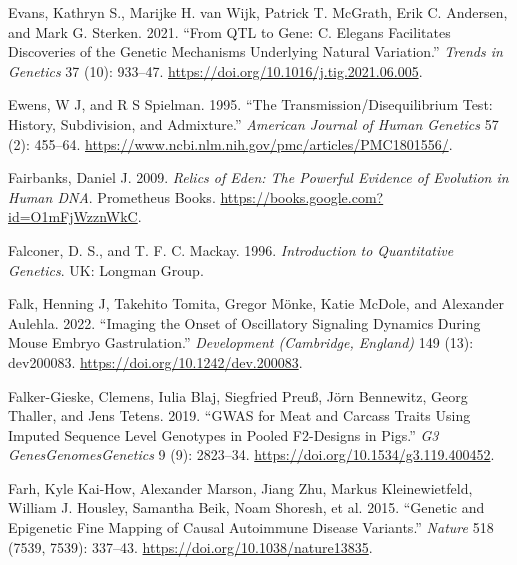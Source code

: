 \documentclass[
]{book}
\newlength{\cslhangindent}
\newlength{\cslentryspacingunit} %
\newenvironment{CSLReferences}[2] %
 {%
  \setlength{\parindent}{0pt}
  \ifodd #1
  \let\oldpar\par
  \def\par{\hangindent=\cslhangindent\oldpar}
  \fi
  \setlength{\parskip}{#2\cslentryspacingunit}
 }%
 {}
\begin{document}
\begin{CSLReferences}{1}{0}
\leavevmode{}%
Evans, Kathryn S., Marijke H. van Wijk, Patrick T. McGrath, Erik C. Andersen, and Mark G. Sterken. 2021. {``From {QTL} to Gene: {C}. Elegans Facilitates Discoveries of the Genetic Mechanisms Underlying Natural Variation.''} \emph{Trends in Genetics} 37 (10): 933--47. \url{https://doi.org/10.1016/j.tig.2021.06.005}.

\leavevmode{}%
Ewens, W J, and R S Spielman. 1995. {``The Transmission/Disequilibrium Test: History, Subdivision, and Admixture.''} \emph{American Journal of Human Genetics} 57 (2): 455--64. \url{https://www.ncbi.nlm.nih.gov/pmc/articles/PMC1801556/}.

\leavevmode{}%
Fairbanks, Daniel J. 2009. \emph{Relics of {Eden}: {The Powerful Evidence} of {Evolution} in {Human DNA}}. {Prometheus Books}. \url{https://books.google.com?id=O1mFjWzznWkC}.

\leavevmode{}%
Falconer, D. S., and T. F. C. Mackay. 1996. \emph{Introduction to Quantitative Genetics}. {UK: Longman Group}.

\leavevmode{}%
Falk, Henning J, Takehito Tomita, Gregor Mönke, Katie McDole, and Alexander Aulehla. 2022. {``Imaging the Onset of Oscillatory Signaling Dynamics During Mouse Embryo Gastrulation.''} \emph{Development (Cambridge, England)} 149 (13): dev200083. \url{https://doi.org/10.1242/dev.200083}.

\leavevmode{}%
Falker-Gieske, Clemens, Iulia Blaj, Siegfried Preuß, Jörn Bennewitz, Georg Thaller, and Jens Tetens. 2019. {``{GWAS} for {Meat} and {Carcass Traits Using Imputed Sequence Level Genotypes} in {Pooled F2-Designs} in {Pigs}.''} \emph{G3 Genes\textbar Genomes\textbar Genetics} 9 (9): 2823--34. \url{https://doi.org/10.1534/g3.119.400452}.

\leavevmode{}%
Farh, Kyle Kai-How, Alexander Marson, Jiang Zhu, Markus Kleinewietfeld, William J. Housley, Samantha Beik, Noam Shoresh, et al. 2015. {``Genetic and Epigenetic Fine Mapping of Causal Autoimmune Disease Variants.''} \emph{Nature} 518 (7539, 7539): 337--43. \url{https://doi.org/10.1038/nature13835}.


\end{CSLReferences}
\end{document}
